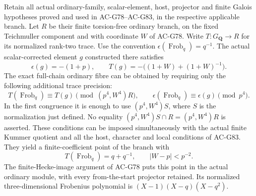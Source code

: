 \begin{theorem}
\label{thm:G84}
Retain all actual ordinary-family, scalar-element, host,
projector and finite Galois hypotheses proved and used in
AC-G78--AC-G83, in the respective applicable branch.
Let \(R\) be their finite torsion-free ordinary branch, on the
fixed Teichmuller component and with coordinate \(W\) of AC-G78.
Write \(T:G_{\mathbf Q}\to R\) for its normalized rank-two trace.
Use the convention
\(\epsilon(\operatorname{Frob}_q)=q^{-1}\).
The actual scalar-corrected element \(g\) constructed there satisfies
\[
 \epsilon(g)=-(1+p),\qquad
 T(g)=-\big((1+W)+(1+W)^{-1}\big).
 \tag{G84.9}
\]
The exact full-chain ordinary fibre can be obtained by requiring
only the following additional trace precision:
\[
 T(\operatorname{Frob}_q)\equiv T(g)
       \pmod{(p^4,W^4)R},\qquad
 \epsilon(\operatorname{Frob}_q)\equiv\epsilon(g)\pmod{p^4}.
 \tag{G84.10}
\]
In the first congruence it is enough to use
\((p^4,W^4)S\), where \(S\) is the normalization just defined.
No equality \((p^4,W^4)S\cap R=(p^4,W^4)R\) is asserted.
These conditions can be imposed simultaneously with the actual
finite Kummer quotient and all the host, character and local
conditions of AC-G83. They yield a finite-coefficient point of
the branch with
\[
 T(\operatorname{Frob}_q)=q+q^{-1},\qquad
 |W-p|<p^{-2}.
 \tag{G84.11}
\]
The finite-Hecke-image argument of AC-G78 puts this point in the
actual ordinary module, with every from-the-start projector
retained. Its normalized three-dimensional Frobenius polynomial
is \((X-1)(X-q)(X-q^2)\).
\end{theorem}


